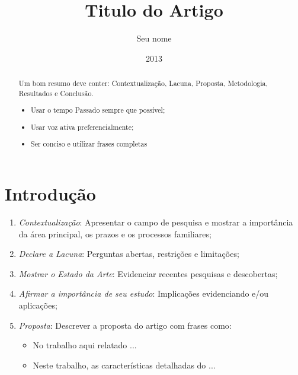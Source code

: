 \documentclass[12pt, a4paper]{article}
\title{Titulo do Artigo}
\author{Seu nome}
\date{2013}
\begin{document}
\maketitle

\begin{abstract}
Um bom resumo deve conter: Contextualização, Lacuna, Proposta, Metodologia, Resultados e Conclusão.

\begin{itemize}
	\item Usar o tempo Passado sempre que possível;
	\item Usar voz ativa preferencialmente;
	\item Ser conciso e utilizar frases completas
\end{itemize}

\end{abstract}


\section{Introdução}
\begin{enumerate}
	\item \textit{Contextualização}: Apresentar o campo de pesquisa e mostrar a importância da área principal, os prazos e os processos familiares;
	\item \textit{Declare a Lacuna}: Perguntas abertas, restrições e limitações;
	\item \textit{Mostrar o Estado da Arte}: Evidenciar recentes pesquisas e descobertas;
	\item \textit{Afirmar a importância de seu estudo}: Implicações evidenciando e/ou aplicações;
	\item \textit{Proposta}: Descrever a proposta do artigo com frases como:
	\begin{itemize}
		\item No trabalho aqui relatado ...
		\item Neste trabalho, as características detalhadas do ...
	\end{itemize}
\end{enumerate}
\end{document}
